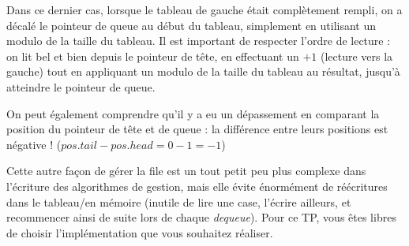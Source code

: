 \documentclass[11pt,a4paper]{article}
\begin{document}
\smallskip

Dans ce dernier cas, lorsque le tableau de gauche était complètement rempli, on a décalé le pointeur de queue au début du tableau, simplement en utilisant un modulo de la taille du tableau.
Il est important de respecter l'ordre de lecture : on lit bel et bien depuis le pointeur de tête, en effectuant un $ +1 $ (lecture vers la gauche) tout en appliquant un modulo de la taille du tableau au résultat, jusqu'à atteindre le pointeur de queue.

On peut également comprendre qu'il y a eu un dépassement en comparant la position du pointeur de tête et de queue : la différence entre leurs positions est négative ! \linebreak
($ pos. tail - pos. head = 0 - 1 = -1$)

\bigskip

Cette autre façon de gérer la file est un tout petit peu plus complexe dans l'écriture des algorithmes de gestion, mais elle évite énormément de réécritures dans le tableau/en mémoire (inutile de lire une case, l'écrire ailleurs, et recommencer ainsi de suite lors de chaque \textit{dequeue}).
Pour ce TP, vous êtes libres de choisir l'implémentation que vous souhaitez réaliser.

\bigskip
\end{document}

